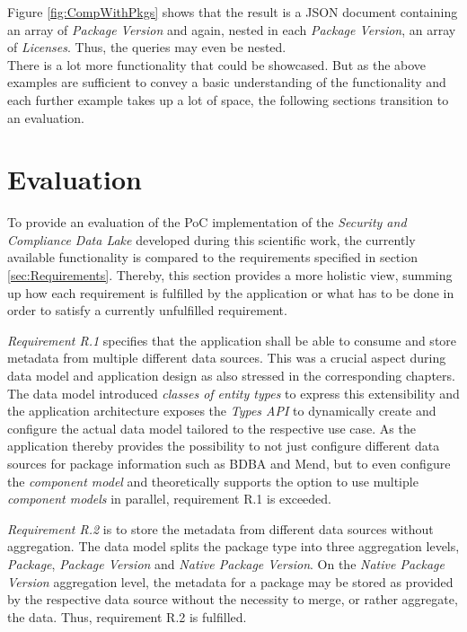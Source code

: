Figure \ref{fig:CompWithPkgs} shows that the result is a JSON document containing an array of \emph{Package Version} and again, nested in each \emph{Package Version}, an array of \emph{Licenses}. Thus, the queries may even be nested.\\

There is a lot more functionality that could be showcased. But as the above examples are sufficient to convey a basic understanding of the functionality and each further example takes up a lot of space, the following sections transition to an evaluation. 

\section{Evaluation}
To provide an evaluation of the PoC implementation of the \emph{Security and Compliance Data Lake} developed during this scientific work, the currently available functionality is compared to the requirements specified in section \ref{sec:Requirements}. Thereby, this section provides a more holistic view, summing up how each requirement is fulfilled by the application or what has to be done in order to satisfy a currently unfulfilled requirement.\par
\emph{Requirement R.1} specifies that the application shall be able to consume and store metadata from multiple different data sources. This was a crucial aspect during data model and application design as also stressed in the corresponding chapters. The data model introduced \emph{classes of entity types} to express this extensibility and the application architecture exposes the \emph{Types API} to dynamically create and configure the actual data model tailored to the respective use case. As the application thereby provides the possibility to not just configure different data sources for package information such as BDBA and Mend, but to even configure the \emph{component model} and theoretically supports the option to use multiple \emph{component models} in parallel, requirement R.1 is exceeded.\par
\emph{Requirement R.2} is to store the metadata from different data sources without aggregation. The data model splits the package type into three aggregation levels, \emph{Package}, \emph{Package Version} and \emph{Native Package Version}. On the \emph{Native Package Version} aggregation level, the metadata for a package may be stored as provided by the respective data source without the necessity to merge, or rather aggregate, the data. Thus, requirement R.2 is fulfilled.\par
